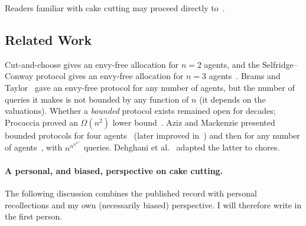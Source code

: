 \documentclass[11pt]{article}
\theoremstyle{plain}
\theoremstyle{definition}
\theoremstyle{plain}
\begin{document}
Readers familiar with cake cutting may proceed directly to~.


\subsection{Related Work}

Cut-and-choose gives an envy-free allocation for $n=2$ agents, and the Selfridge--Conway protocol gives an envy-free allocation for $n=3$ agents~\cite{robertson1998cake}. Brams and Taylor~\cite{brams1995envy} gave an envy-free protocol for any number of agents, but the number of queries it makes is not bounded by any function of $n$ (it depends on the valuations). Whether a \emph{bounded} protocol exists remained open for decades; Procaccia proved an $\Omega(n^2)$ lower bound~\cite{procaccia2009thou}. Aziz and Mackenzie presented bounded protocols for four agents~\cite{aziz2016discretefour} (later improved in~\cite{amanatidis2018improved}) and then for any number of agents~\cite{aziz2016discrete}, with $n^{n^{n^{n^{n^n}}}}$ queries. Dehghani et al.~\cite{dehghani2018envy} adapted the latter to chores.


\paragraph{A personal, and biased, perspective on cake cutting.}

The following discussion combines the published record with personal recollections and my own (necessarily biased) perspective. I will therefore write in the first person.
\end{document}
